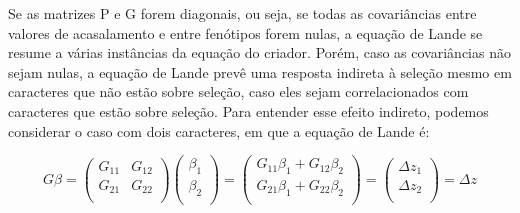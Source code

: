 \begin{refsection}
Se as matrizes P e G forem diagonais, ou seja, se todas as covariâncias entre
valores de acasalamento e entre fenótipos forem nulas, a equação de Lande se
resume a várias instâncias da equação do criador. Porém, caso as covariâncias
não sejam nulas, a equação de Lande prevê uma resposta indireta à seleção
mesmo em caracteres que não estão sobre seleção, caso eles sejam
correlacionados com caracteres que estão sobre seleção. Para entender esse
efeito indireto, podemos considerar o caso com dois caracteres, em que a
equação de Lande é:

\begin{equation}
G\beta  =
\left (
\begin{matrix}
G_{11} & G_{12} \\
G_{21} & G_{22} \\
\end{matrix}
\right )
\left (
\begin{matrix}
\beta_{1}  \\
\beta_{2}   \\
\end{matrix}
\right )
=
\left (
\begin{matrix}
G_{11}\beta_{1} +  G_{12}\beta_{2} \\
G_{21}\beta_{1} +  G_{22}\beta_{2} \\
\end{matrix}
\right )
=
\left (
\begin{matrix}
\Delta z_{1}  \\
\Delta z_{2}   \\
\end{matrix}
\right )
=
\Delta z
\end{equation}


\end{refsection}
